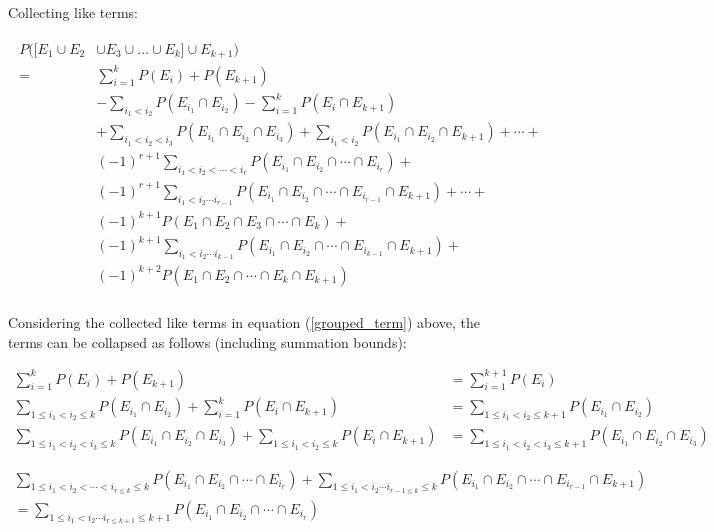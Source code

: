 \documentclass[a4paper]{article}
\begin{document}
    Collecting like terms:

    \begin{align}
        \begin{split} \label{grouped_term}
            P([E_1 \cup E_2 &\cup E_3 \cup \dots \cup E_k] \cup E_{k + 1}) \\
            = & \sum_{i = 1}^{k} P(E_i) + P(E_{k + 1}) \\
            & - \sum_{i_1 < i_2} P(E_{i_1} \cap E_{i_2}) - \sum_{i = 1}^{k} P(E_i \cap E_{k + 1}) \\
            & + \sum_{i_1 < i_2 < i_3} P(E_{i_1} \cap E_{i_2} \cap E_{i_3}) + \sum_{i_1 < i_2} P(E_{i_1} \cap E_{i_2} \cap E_{k + 1}) + \cdots + \\
            & {(-1)}^{r + 1} \sum_{i_1 < i_2 < \cdots < i_r} P(E_{i_1} \cap E_{i_2} \cap \cdots \cap E_{i_r}) + \\
            & {(-1)}^{r + 1} \sum_{i_1 < i_2 \cdots i_{r - 1}} P(E_{i_1} \cap E_{i_2} \cap \cdots \cap E_{i_{r - 1}} \cap E_{k + 1}) + \cdots + \\
            & {(-1)}^{k + 1} P(E_1 \cap E_2 \cap E_3 \cap \cdots \cap E_k) + \\
            & {(-1)}^{k + 1} \sum_{i_1 < i_2 \cdots i_{k - 1}} P(E_{i_1} \cap E_{i_2} \cap \cdots \cap E_{i_{k - 1}} \cap E_{k + 1}) + \\
            & {(-1)}^{k + 2} P(E_1 \cap E_2 \cap \cdots \cap E_k \cap E_{k + 1}) \\
        \end{split}
    \end{align}

    Considering the collected like terms in equation (\ref{grouped_term}) above, the terms can be collapsed as follows (including summation bounds):

    \begin{align} \label{collapsed_term1}
        \sum_{i = 1}^{k} P(E_i) + P(E_{k + 1}) &= \sum_{i = 1}^{k + 1} P(E_i) \\
        \sum_{1 \le i_1 < i_2 \le k} P(E_{i_1} \cap E_{i_2}) + \sum_{i = 1}^{k} P(E_i \cap E_{k + 1}) &= \sum_{1 \le i_1 < i_2 \le {k + 1}} P(E_{i_1} \cap E_{i_2}) \\
        \sum_{1 \le i_1 < i_2 < i_3 \le k} P(E_{i_1} \cap E_{i_2} \cap E_{i_3}) + \sum_{1 \le i_1 < i_2 \le k} P(E_i \cap E_{k + 1}) &= \sum_{1 \le i_1 < i_2 < i_3 \le {k + 1}} P(E_{i_1} \cap E_{i_2} \cap E_{i_3})
    \end{align}

    \begin{multline} \label{collapsed_term2}
        \sum_{1 \le i_1 < i_2 < \cdots < i_{r \le k} \le k} P(E_{i_1} \cap E_{i_2} \cap \cdots \cap E_{i_r}) + \sum_{1 \le i_1 < i_2 \cdots i_{r - 1 \le k} \le k} P(E_{i_1} \cap E_{i_2} \cap \cdots \cap E_{i_{r - 1}} \cap E_{k + 1}) \\
        = \sum_{1 \le i_1 < i_2 \cdots i_{r \le {k + 1}} \le {k + 1}} P(E_{i_1} \cap E_{i_2} \cap \cdots \cap E_{i_r})
    \end{multline}
\end{document}
